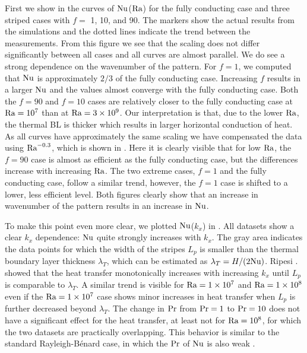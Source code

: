 First we show in  the curves of $\text{Nu}$($\text{Ra}$) for
the fully conducting case and three striped cases with $f=$ 1, 10, and 90.
The markers show the actual results from the simulations and the dotted lines
indicate the trend between the measurements.  From this figure we see that the
scaling does not differ significantly between all cases and all curves are
almost parallel.  We do see a strong dependence on the wavenumber of the
pattern.  For $f=1$, we computed that $\text{Nu}$ is approximately $2/3$ of the
fully conducting case.  Increasing $f$ results in a larger $\text{Nu}$ and the
values almost converge with the fully conducting case.  Both the $f=90$ and
$f=10$ cases are relatively closer to the fully conducting case at $\text{Ra}=10^7$
than at $\text{Ra}=3 \times 10^9$. Our interpretation is that, due to the lower
$\text{Ra}$, the thermal BL is thicker which results in larger horizontal
conduction of heat.  As all curves have approximately the same scaling we have
compensated the data using $\text{Ra}^{-0.3}$, which is shown in 
.  Here it is clearly visible that for low $\text{Ra}$, the
$f=90$ case is almost as efficient as the fully conducting case, but the
differences increase with increasing $\text{Ra}$.  The two extreme cases, $f=1$ and
the fully conducting case, follow a similar trend, however, the $f=1$ case is
shifted to a lower, less efficient level.  Both figures clearly show that an
increase in wavenumber of the pattern results in an increase in $\text{Nu}$.


To make this point even more clear, we plotted $\text{Nu}$($k_x$) in 
.  All datasets show a clear $k_x$ dependence: $\text{Nu}$ quite
strongly increases with $k_x$.  The gray area indicates the data points for
which the width of the stripes $L_p$ is smaller than the thermal boundary
layer thickness $\lambda_T$, which can be estimated as $\lambda_T = H / (2
\text{Nu})$.  Ripesi . showed that the heat transfer monotonically
increases with increasing $k_x$ until $L_p$ is comparable to $\lambda_T$.  A
similar trend is visible for $\text{Ra}=\num{1e7}$ and $\text{Ra}=\num{1e8}$ even if the
$\text{Ra}=\num{1e7}$ case shows minor increases in heat transfer when $L_p$ is
further decreased beyond $\lambda_T$.  The change in $\text{Pr}$ from $\text{Pr}=1$ to
$\text{Pr}=10$ does not have a significant effect for the heat transfer, at least
not for $\text{Ra} = 10^8$, for which the two datasets are practically overlapping.
This behavior is similar to the standard Rayleigh-B\'enard case, in which the
$\text{Pr}$ of $\text{Nu}$ is also weak \citep{Ahlers2009}.


